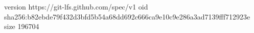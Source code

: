 version https://git-lfs.github.com/spec/v1
oid sha256:b82ebde79f432d3bfd5b54a68dd692c666ca9e10c9e286a3ad7139fff712923e
size 196704
